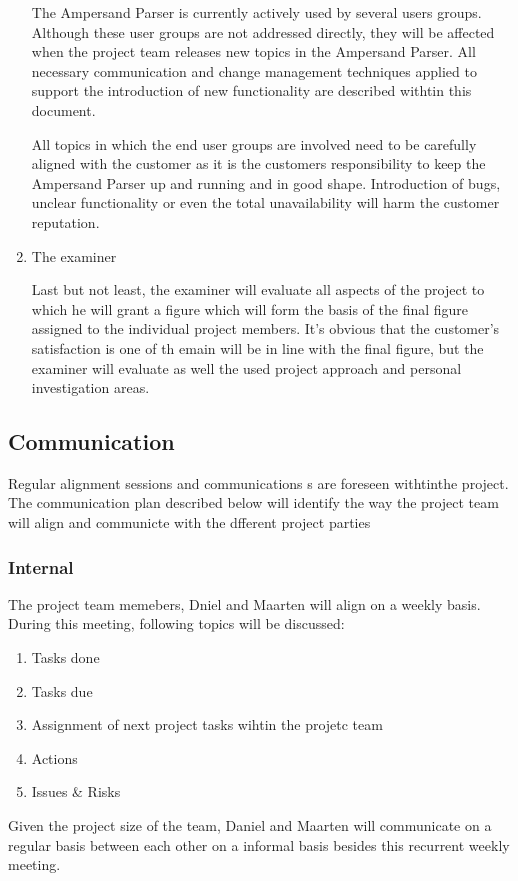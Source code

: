 \begin{enumerate}
The Ampersand Parser is currently actively used by several users groups. Although these user groups are not addressed directly, they will be affected when the project team releases new topics in the Ampersand Parser. All necessary communication and change management techniques applied to support the introduction of new functionality are described withtin this document.

All topics in which the end user groups are involved need to be carefully aligned with the customer as it is the customers responsibility to keep the Ampersand Parser up and running and in good shape. Introduction of bugs, unclear functionality or even the total unavailability will harm the customer reputation.

	\item The examiner

	Last but not least, the examiner will evaluate all aspects of the project to which he will grant a figure  which will form the basis of the final figure assigned to the individual project members. It's obvious that the customer's satisfaction is one of th emain will be in line with the final figure, but the examiner will evaluate as well the used project approach and personal investigation areas.

\end {enumerate}


\subsection{Communication}
Regular alignment sessions and communications s are foreseen withtinthe project. The communication plan described below will identify the way the project team will align and communicte with the dfferent project parties

\subsubsection{Internal}
The project team memebers, Dniel and Maarten will align on a weekly basis.
During this meeting, following topics will be discussed:
\begin{enumerate}
	\item Tasks done
	\item Tasks due
	\item Assignment of next project tasks wihtin the projetc team
	\item Actions
	\item Issues \& Risks
\end {enumerate}
Given the project size of the team, Daniel and Maarten will communicate on a regular basis between each other on a informal basis besides this recurrent weekly meeting.
